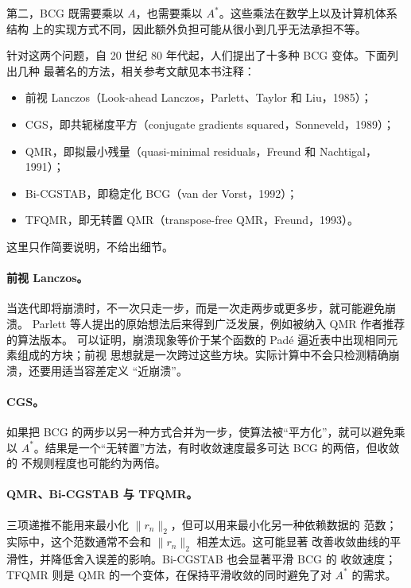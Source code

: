 \documentclass[UTF8,fontset=none,12pt]{ctexart}
\begin{document}
第二，BCG 既需要乘以 $A$，也需要乘以 $A^*$。这些乘法在数学上以及计算机体系结构
上的实现方式不同，因此额外负担可能从很小到几乎无法承担不等。

针对这两个问题，自 20 世纪 80 年代起，人们提出了十多种 BCG 变体。下面列出几种
最著名的方法，相关参考文献见本书注释：

\begin{itemize}[leftmargin=2.6em]
\item 前视 Lanczos（Look-ahead Lanczos，Parlett、Taylor 和 Liu，1985）；
\item CGS，即共轭梯度平方（conjugate gradients squared，Sonneveld，1989）；
\item QMR，即拟最小残量（quasi-minimal residuals，Freund 和 Nachtigal，1991）；
\item Bi-CGSTAB，即稳定化 BCG（van der Vorst，1992）；
\item TFQMR，即无转置 QMR（transpose-free QMR，Freund，1993）。
\end{itemize}

这里只作简要说明，不给出细节。

\paragraph{前视 Lanczos。}
当迭代即将崩溃时，不一次只走一步，而是一次走两步或更多步，就可能避免崩溃。
Parlett 等人提出的原始想法后来得到广泛发展，例如被纳入 QMR 作者推荐的算法版本。
可以证明，崩溃现象等价于某个函数的 Padé 逼近表中出现相同元素组成的方块；前视
思想就是一次跨过这些方块。实际计算中不会只检测精确崩溃，还要用适当容差定义
“近崩溃”。

\paragraph{CGS。}
如果把 BCG 的两步以另一种方式合并为一步，使算法被“平方化”，就可以避免乘以
$A^*$。结果是一个“无转置”方法，有时收敛速度最多可达 BCG 的两倍，但收敛的
不规则程度也可能约为两倍。

\paragraph{QMR、Bi-CGSTAB 与 TFQMR。}
三项递推不能用来最小化 $\lVert r_n\rVert_2$，但可以用来最小化另一种依赖数据的
范数；实际中，这个范数通常不会和 $\lVert r_n\rVert_2$ 相差太远。这可能显著
改善收敛曲线的平滑性，并降低舍入误差的影响。Bi-CGSTAB 也会显著平滑 BCG 的
收敛速度；TFQMR 则是 QMR 的一个变体，在保持平滑收敛的同时避免了对 $A^*$ 的需求。
\end{document}
